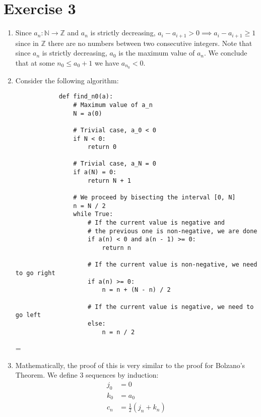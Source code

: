 \documentclass[10pt]{article}
\newcommand{\N}{\mathbb{N}}
\newcommand{\Z}{\mathbb{Z}}
\newenvironment{absolutelynopagebreak}
  {\par\nobreak\vfil\penalty0\vfilneg
   \vtop\bgroup}
  {\par\xdef\tpd{\the\prevdepth}\egroup
   \prevdepth=\tpd}
\begin{document}
\section*{Exercise 3}

\begin{enumerate}
    \item Since $a_n: \N \to \Z$ and $a_n$ is strictly decreasing,
          $a_{i} - a_{i+1} > 0 \implies a_{i} - a_{i+1} \geq 1$ since in $\Z$ there are no numbers between two consecutive integers.
          Note that since $a_n$ is strictly decreasing, $a_0$ is the maximum value of $a_n$.
          We conclude that at some $n_0 \leq a_0 + 1$ we have $a_{n_0} < 0$.

    \item Consider the following algorithm:
          \begin{absolutelynopagebreak}
              \begin{verbatim}
            def find_n0(a):
                # Maximum value of a_n
                N = a(0)

                # Trivial case, a_0 < 0
                if N < 0:
                    return 0
                
                # Trivial case, a_N = 0
                if a(N) = 0:
                    return N + 1

                # We proceed by bisecting the interval [0, N]
                n = N / 2
                while True:
                    # If the current value is negative and 
                    # the previous one is non-negative, we are done
                    if a(n) < 0 and a(n - 1) >= 0:
                        return n

                    # If the current value is non-negative, we need to go right
                    if a(n) >= 0:
                        n = n + (N - n) / 2

                    # If the current value is negative, we need to go left
                    else:
                        n = n / 2
          \end{verbatim}
          \end{absolutelynopagebreak}


    \item Mathematically, the proof of this is very similar to the proof for Bolzano's Theorem.
          We define 3 sequences by induction:
          \begin{align*}
              j_0 & = 0                      \\
              k_0 & = a_0                    \\
              c_n & = \frac{1}{2}(j_n + k_n) \\
          \end{align*}


\end{enumerate}
\end{document}
